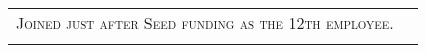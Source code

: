 \documentclass[a4paper, oneside, final]{scrartcl}
\begin{document}
\begin{center}
\begin{tabularx}{0.97\linewidth}{>{\raggedleft\scshape}p{2cm}X}
Joined just after Seed funding as the 12th employee.
\\
\\
\end{tabularx}


\end{center}
\end{document}
